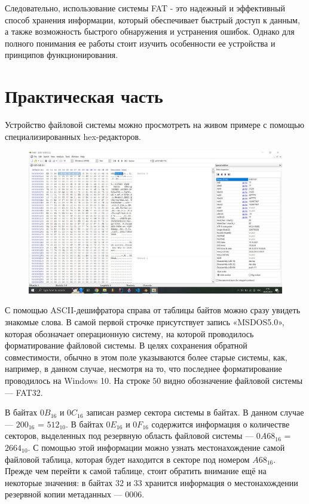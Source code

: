 \documentclass[a4paper,12pt]{article}
\begin{document}
    Следовательно, использование системы FAT - это надежный и эффективный способ хранения информации, который обеспечивает быстрый доступ к данным, а также возможность быстрого обнаружения и устранения ошибок. Однако для полного понимания ее работы стоит изучить особенности ее устройства и принципов функционирования.

    \section{Практическая часть}
    
    Устройство файловой системы можно просмотреть на живом примере с помощью специализированных hex-редакторов.
    
    \begin{figure}[H]
        \centering
        \includegraphics[width=\linewidth]{img1}
    \end{figure}

    С помощью ASCII-дешифратора справа от таблицы байтов можно сразу увидеть знакомые слова. В самой первой строчке присутствует запись «MSDOS5.0», которая обозначает операционную систему, на которой проводилось форматирование файловой системы. В целях сохранения обратной совместимости, обычно в этом поле указываются более старые системы, как, например, в данном случае, несмотря на то, что последнее форматирование проводилось на Windows 10. На строке $50$ видно обозначение файловой системы — FAT32.
    
    В байтах $0B_{16}$ и $0C_{16}$ записан размер сектора системы в байтах. В данном случае — $200_{16}$ = $512_{10}$. В байтах $0E_{16}$ и $0F_{16}$ содержится информация о количестве секторов, выделенных под резервную область файловой системы — $0A68_{16}$ = $2664_{10}$. С помощью этой информации можно узнать местонахождение самой файловой таблица, которая будет находится в секторе под номером $A68_{16}$. Прежде чем перейти к самой таблице, стоит обратить внимание ещё на некоторые значения: в байтах $32$ и $33$ хранится информация о местонахождении резервной копии метаданных — $0006$.
    
\end{document}
